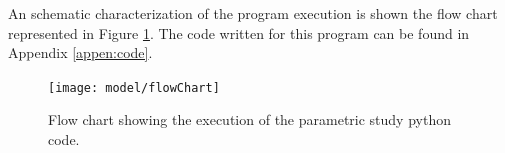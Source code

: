     An schematic characterization of the program execution is shown the flow chart represented in Figure \ref{fig:flowChart}. The code written for this program can be found in Appendix \ref{appen:code}. 

    \begin{figure}[!htpb]
      \centering
      \texttt{[image: model/flowChart]}
      \caption[Flow chart showing the execution of the parametric study code]{Flow chart showing the execution of the parametric study python code.}\label{fig:flowChart}
    \end{figure}
